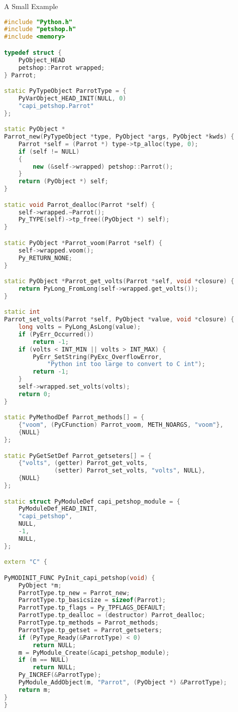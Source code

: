 \documentclass{beamer}
\newcommand\supertiny{\fontsize{3.5pt}{4.2}\selectfont}
\begin{document}
\begin{frame}[fragile]{A Small Example}
  \begin{lstlisting}[language=c++,
    basicstyle=\ttfamily\supertiny,
    numberstyle=\supertiny,
    multicols=2]
#include "Python.h"
#include "petshop.h"
#include <memory>

typedef struct {
    PyObject_HEAD
    petshop::Parrot wrapped;
} Parrot;

static PyTypeObject ParrotType = {
    PyVarObject_HEAD_INIT(NULL, 0)
    "capi_petshop.Parrot"
};

static PyObject *
Parrot_new(PyTypeObject *type, PyObject *args, PyObject *kwds) {
    Parrot *self = (Parrot *) type->tp_alloc(type, 0);
    if (self != NULL)
    {
        new (&self->wrapped) petshop::Parrot();
    }
    return (PyObject *) self;
}

static void Parrot_dealloc(Parrot *self) {
    self->wrapped.~Parrot();
    Py_TYPE(self)->tp_free((PyObject *) self);
}

static PyObject *Parrot_voom(Parrot *self) {
    self->wrapped.voom();
    Py_RETURN_NONE;
}

static PyObject *Parrot_get_volts(Parrot *self, void *closure) {
    return PyLong_FromLong(self->wrapped.get_volts());
}

static int
Parrot_set_volts(Parrot *self, PyObject *value, void *closure) {
    long volts = PyLong_AsLong(value);
    if (PyErr_Occurred())
        return -1;
    if (volts < INT_MIN || volts > INT_MAX) {
        PyErr_SetString(PyExc_OverflowError,
            "Python int too large to convert to C int");
        return -1;
    }
    self->wrapped.set_volts(volts);
    return 0;
}

static PyMethodDef Parrot_methods[] = {
    {"voom", (PyCFunction) Parrot_voom, METH_NOARGS, "voom"},
    {NULL}
};

static PyGetSetDef Parrot_getseters[] = {
    {"volts", (getter) Parrot_get_volts,
              (setter) Parrot_set_volts, "volts", NULL},
    {NULL}
};

static struct PyModuleDef capi_petshop_module = {
    PyModuleDef_HEAD_INIT,
    "capi_petshop",
    NULL,
    -1,
    NULL,
};

extern "C" {

PyMODINIT_FUNC PyInit_capi_petshop(void) {
    PyObject *m;
    ParrotType.tp_new = Parrot_new;
    ParrotType.tp_basicsize = sizeof(Parrot);
    ParrotType.tp_flags = Py_TPFLAGS_DEFAULT;
    ParrotType.tp_dealloc = (destructor) Parrot_dealloc;
    ParrotType.tp_methods = Parrot_methods;
    ParrotType.tp_getset = Parrot_getseters;
    if (PyType_Ready(&ParrotType) < 0)
        return NULL;
    m = PyModule_Create(&capi_petshop_module);
    if (m == NULL)
        return NULL;
    Py_INCREF(&ParrotType);
    PyModule_AddObject(m, "Parrot", (PyObject *) &ParrotType);
    return m;
}
}
  \end{lstlisting}
  \pause
\end{frame}
\end{document}
